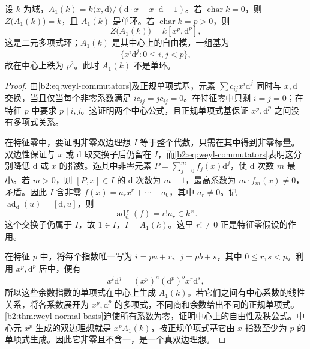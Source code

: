 \begin{theorem}\label{b2:thm:weyl-center-simplicity}
	设 \(k\) 为域，\(A_1(k)=k\langle x,\mathrm{d}\rangle/(\mathrm{d}\cdot x-x\cdot\mathrm{d}-1)\)。若 \(\operatorname{char}k=0\)，则 \(Z\bigl(A_1(k)\bigr)=k\)，且 \(A_1(k)\) 是单环。若 \(\operatorname{char}k=p>0\)，则
	\[
		Z\bigl(A_1(k)\bigr)=k[x^p,\mathrm{d}^p],
	\]
	这是二元多项式环；\(A_1(k)\) 是其中心上的自由模，一组基为
	\[
		\{x^i\mathrm{d}^j:0\le i,j<p\},
	\]
	故在中心上秩为 \(p^2\)。此时 \(A_1(k)\) 不是单环。
\end{theorem}
\begin{proof}
	由\eqref{b2:eq:weyl-commutators}及正规单项式基，元素 \(\sum c_{ij}x^i\mathrm{d}^j\) 同时与 \(x,\mathrm{d}\) 交换，当且仅当每个非零系数满足 \(i c_{ij}=j c_{ij}=0\)。在特征零中只剩 \(i=j=0\)；在特征 \(p\) 中要求 \(p\mid i,j\)。这证明两个中心公式，且正规单项式基保证 \(x^p,\mathrm{d}^p\) 之间没有多项式关系。

	在特征零中，要证明非零双边理想 \(I\) 等于整个代数，只需在其中得到非零标量。双边性保证与 \(x\) 或 \(\mathrm{d}\) 取交换子后仍留在 \(I\)，而\eqref{b2:eq:weyl-commutators}表明这分别降低 \(\mathrm{d}\) 或 \(x\) 的指数。选其中非零元素 \(P=\sum_{j=0}^m f_j(x)\mathrm{d}^j\)，使 \(\mathrm{d}\) 次数 \(m\) 最小。若 \(m>0\)，则 \([P,x]\in I\) 的 \(\mathrm{d}\) 次数为 \(m-1\)，最高系数为 \(m\cdot f_m(x)\ne0\)，矛盾。因此 \(I\) 含非零 \(f(x)=a_rx^r+\cdots+a_0\)，其中 \(a_r\ne0\)。记 \(\operatorname{ad}_{\mathrm{d}}(u)=[\mathrm{d},u]\)，则
	\[
		\operatorname{ad}_{\mathrm{d}}^{\,r}(f)=r!a_r\in k^\times.
	\]
	这个交换子仍属于 \(I\)，故 \(1\in I\)，\(I=A_1(k)\)。这里 \(r!\ne0\) 正是特征零假设的作用。

	在特征 \(p\) 中，将每个指数唯一写为 \(i=pa+r\)、\(j=pb+s\)，其中 \(0\le r,s<p\)。利用 \(x^p,\mathrm{d}^p\) 居中，便有
	\[
		x^i\mathrm{d}^j=(x^p)^a(\mathrm{d}^p)^b x^r\mathrm{d}^s,
	\]
	所以这些余数指数的单项式在中心上生成 \(A_1(k)\)。若它们之间有中心系数的线性关系，将各系数展开为 \(x^p,\mathrm{d}^p\) 的多项式，不同商和余数给出不同的正规单项式。\cref{b2:thm:weyl-normal-basis}迫使所有系数为零，证明中心上的自由性及秩公式。中心元 \(x^p\) 生成的双边理想就是 \(x^pA_1(k)\)，按正规单项式基它由 \(x\) 指数至少为 \(p\) 的单项式生成。因此它非零且不含一，是一个真双边理想。
\end{proof}

